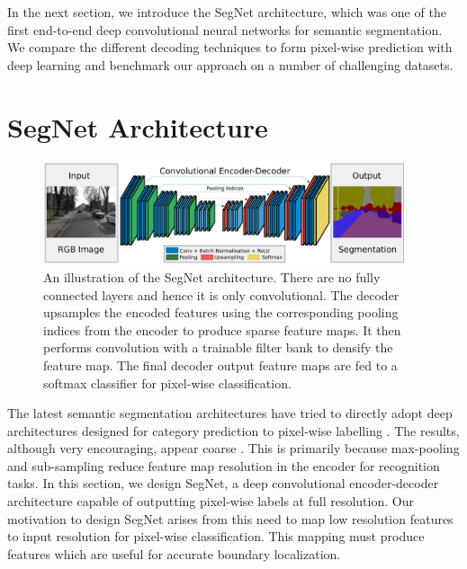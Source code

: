 In the next section, we introduce the SegNet architecture, which was one of the first end-to-end deep convolutional neural networks for semantic segmentation. We compare the different decoding techniques to form pixel-wise prediction with deep learning and benchmark our approach on a number of challenging datasets.

\section{SegNet Architecture}
\label{segnet}

\begin{figure}[t]
\center
\includegraphics[width=0.95\textwidth]{segnet/segnet_softmax.pdf}
\caption[SegNet architecture.]{An illustration of the SegNet architecture. There are no fully connected layers and hence it is only convolutional. The decoder upsamples the encoded features using the corresponding pooling indices from the encoder to produce sparse feature maps. It then performs convolution with a trainable filter bank to densify the feature map. The final decoder output feature maps are fed to a softmax classifier for pixel-wise classification.}
\label{SegNetArchitecture}
\end{figure}

The latest semantic segmentation architectures have tried to directly adopt deep architectures designed for category prediction to pixel-wise labelling \citep{long2015fully,FarabetPAMI}. The results, although very encouraging, appear coarse \citep{chen2016deeplab}. This is primarily because max-pooling and sub-sampling reduce feature map resolution in the encoder for recognition tasks. In this section, we design SegNet, a deep convolutional encoder-decoder architecture capable of outputting pixel-wise labels at full resolution. Our motivation to design SegNet arises from this need to map low resolution features to input resolution for pixel-wise classification. This mapping must produce features which are useful for accurate boundary localization. 

